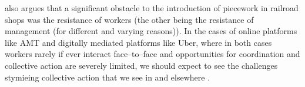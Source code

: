 \documentclass[trackingWork]{subfiles}
\begin{document}
{\citeauthor{10.2307/23702539} also argues that
a significant obstacle to the introduction of piecework in railroad shops was
the resistance of workers
(the other being the resistance of management (for different and varying reasons)).
In the cases of online platforms like AMT and digitally mediated platforms like Uber,
where in both cases workers rarely
if ever
interact face--to--face and
opportunities for coordination and collective action are severely limited,
we should expect to see
the challenges stymieing collective action
that we see in \citeauthor{dynamo} and elsewhere
\cite{10.2307/23702539,dynamo}.

}


\onlyinsubfile{
  \printbibliography
  \clearpage
  \nobalance{}
  \begin{appendices}
  \theendnotes
  \end{appendices}
}
\end{document}
